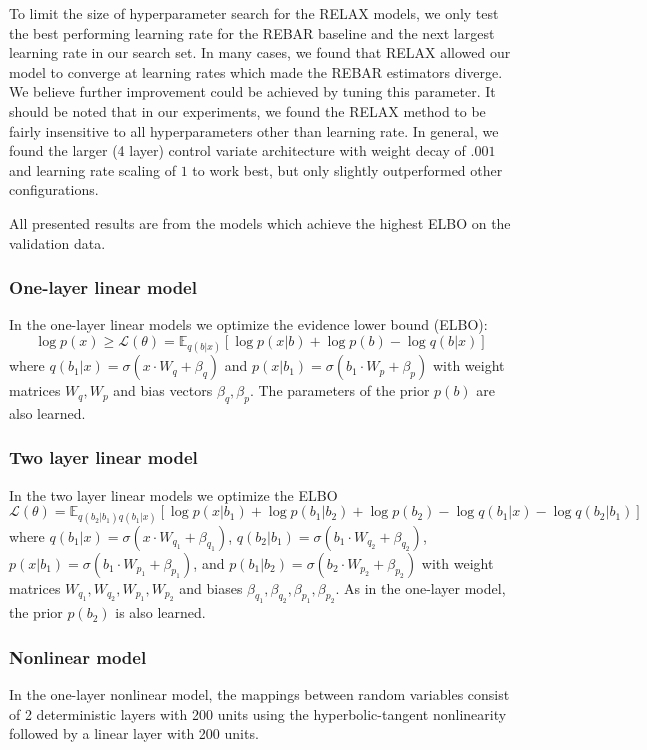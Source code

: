 \documentclass{article}
\newcommand{\E}{\mathbb{E}}
\begin{document}
To limit the size of hyperparameter search for the RELAX models, we only test the best performing learning rate for the REBAR baseline and the next largest learning rate in our search set.
In many cases, we found that RELAX allowed our model to converge at learning rates which made the REBAR estimators diverge.
We believe further improvement could be achieved by tuning this parameter. It should be noted that in our experiments, we found the RELAX method to be fairly insensitive to all hyperparameters other than learning rate. In general, we found the larger (4 layer) control variate architecture with weight decay of $.001$ and learning rate scaling of $1$ to work best, but only slightly outperformed other configurations.  

All presented results are from the models which achieve the highest ELBO on the validation data.
\label{app_disc_vae}
\subsubsection{One-layer linear model}
In the one-layer linear models we optimize the evidence lower bound (ELBO): $$\log p(x) \geq \mathcal{L}(\theta) = \E_{q(b|x)}[\log p(x|b) + \log p(b) - \log q(b|x)]$$ where $q(b_1|x) = \sigma(x\cdot W_q + \beta_q)$ and $p(x| b_1) = \sigma(b_1\cdot W_p + \beta_p)$ with weight matrices $W_q,W_p$ and bias vectors $\beta_q,\beta_p$.
The parameters of the prior $p(b)$ are also learned.


\subsubsection{Two layer linear model}
In the two layer linear models we optimize the ELBO $$\mathcal{L}(\theta) = \E_{q(b_2|b_1)q(b_1|x)}[\log p(x|b_1) + \log p(b_1|b_2) + \log p(b_2) - \log q(b_1|x) - \log q(b_2|b_1)]$$ where $q(b_1|x) = \sigma(x\cdot W_{q_1} + \beta_{q_1})$, $q(b_2|b_1) = \sigma(b_1\cdot W_{q_2} + \beta_{q_2})$, $p(x| b_1) = \sigma(b_1\cdot W_{p_1} + \beta_{p_1})$, and $p(b_1| b_2) = \sigma(b_2\cdot W_{p_2} + \beta_{p_2})$ with weight matrices $W_{q_1},W_{q_2},W_{p_1},W_{p_2}$ and biases $\beta_{q_1},\beta_{q_2},\beta_{p_1},\beta_{p_2}$. As in the one-layer model, the prior $p(b_2)$ is also learned.

\subsubsection{Nonlinear model}
In the one-layer nonlinear model, the mappings between random variables consist of 2 deterministic layers with 200 units using the hyperbolic-tangent nonlinearity followed by a linear layer with 200 units. 
\end{document}
